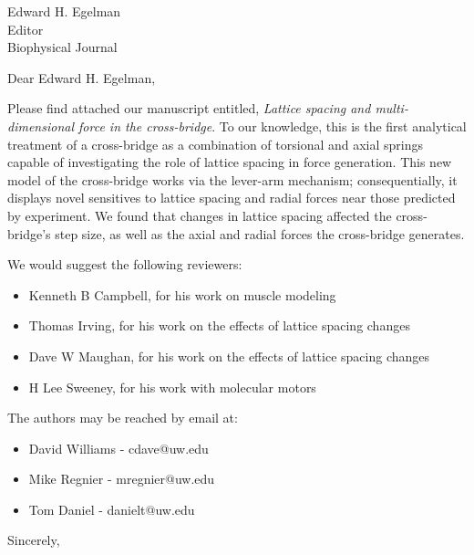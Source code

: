 \documentclass[10pt]{letter}
\begin{document}
\begin{letter}{Edward H. Egelman\\ Editor\\ Biophysical Journal}

\opening{Dear Edward H. Egelman,}

Please find attached our manuscript entitled, \emph{Lattice spacing and multi-dimensional force in the cross-bridge}. 
To our knowledge, this is the first analytical treatment of a cross-bridge as a combination of torsional and axial springs capable of investigating the role of lattice spacing in force generation. 
This new model of the cross-bridge works via the lever-arm mechanism; consequentially, it displays novel sensitives to lattice spacing and radial forces near those predicted by experiment. 
We found that changes in lattice spacing affected the cross-bridge's step size, as well as the axial and radial forces the cross-bridge generates.

We would suggest the following reviewers: 
\begin{itemize}
    \item Kenneth B Campbell, for his work on muscle modeling
    \item Thomas Irving, for his work on the effects of lattice spacing changes
    \item Dave W Maughan, for his work on the effects of lattice spacing changes
    \item H Lee Sweeney, for his work with molecular motors 
\end{itemize}

The authors may be reached by email at: 
\begin{itemize}
    \item David Williams - cdave@uw.edu
    \item Mike Regnier - mregnier@uw.edu
    \item Tom Daniel - danielt@uw.edu
\end{itemize}

\closing{Sincerely,}


\end{letter}
\end{document}
